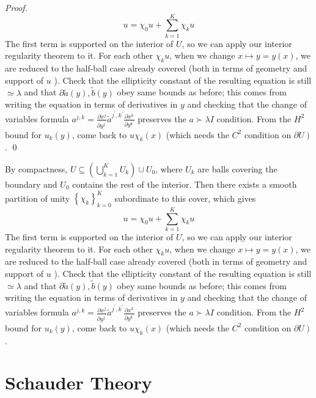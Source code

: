 \begin{proof}
$$
u=\chi_{0} u+\sum_{k=1}^{K} \chi_{k} u
$$
The first term is supported on the interior of $U$, so we can apply our interior regularity theorem to it. For each other $\chi_{k} u$, when we change $x \mapsto y=y(x)$, we are reduced to the half-ball case already covered (both in terms of geometry and support of $u$ ). Check that the ellipticity constant of the resulting equation is still $\simeq \lambda$ and that $\partial \widetilde{a}(y), \tilde{b}(y)$ obey same bounds as before; this comes from writing the equation in terms of derivatives in $y$ and checking that the change of variables formula $a^{j, k}=\frac{\partial x^{j}}{\partial y^{j^{\prime}}} \widetilde{a}^{j^{\prime}, k^{\prime}} \frac{\partial x^{k}}{\partial y^{k^{\prime}}}$ preserves the $a \succ \lambda I$ condition. From the $H^{2}$ bound for $u_{k}(y)$, come back to $u \chi_{k}(x)$ (which needs the $C^{2}$ condition on $\left.\partial U\right)$.
\qed
\end{proof}

By compactness, $U \subseteq\left(\bigcup_{k=1}^{K} U_{k}\right) \cup U_{0}$, where $U_{k}$ are balls covering the boundary and $U_{0}$ contains the rest of the interior. Then there exists a smooth partition of unity $\left\{\chi_{k}\right\}_{k=0}^{K}$ subordinate to this cover, which gives
$$
u=\chi_{0} u+\sum_{k=1}^{K} \chi_{k} u
$$
The first term is supported on the interior of $U$, so we can apply our interior regularity theorem to it. For each other $\chi_{k} u$, when we change $x \mapsto y=y(x)$, we are reduced to the half-ball case already covered (both in terms of geometry and support of $u$ ). Check that the ellipticity constant of the resulting equation is still $\simeq \lambda$ and that $\partial \widetilde{a}(y), \tilde{b}(y)$ obey same bounds as before; this comes from writing the equation in terms of derivatives in $y$ and checking that the change of variables formula $a^{j, k}=\frac{\partial x^{j}}{\partial y^{j^{\prime}}} \widetilde{a}^{j^{\prime}, k^{\prime}} \frac{\partial x^{k}}{\partial y^{k^{\prime}}}$ preserves the $a \succ \lambda I$ condition. From the $H^{2}$ bound for $u_{k}(y)$, come back to $u \chi_{k}(x)$ (which needs the $C^{2}$ condition on $\left.\partial U\right)$.


\newpage
\section{Schauder Theory}

